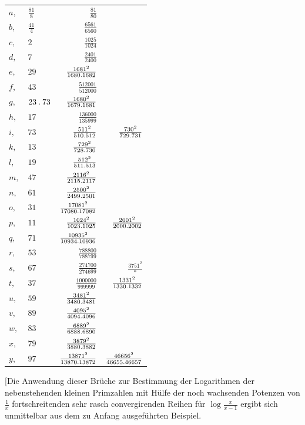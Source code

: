 \begin{longtable}{@{}llrr@{}}
$a,$ & $\frac{81}{8}$ & $\frac{81}{80}$ & \\
$b,$ & $\frac{41}{4}$ & $\frac{6561}{6560}$ & \\
$c,$ & $2$ & $\frac{1025}{1024}$ & \\
$d,$ & $7$ & $\frac{2401}{2400}$ & \\
$e,$ & $29$ & $\frac{1681^2}{1680\mathbin{.} 1682}$ & \\
$f,$ & $43$ & $\frac{512001}{512000}$ & \\
$g,$ & $23\mathbin{.} 73$ & $\frac{1680^2}{1679\mathbin{.} 1681}$ & \\
$h,$ & $17$ & $\frac{136000}{135999}$ & \\
$i,$ & $73$ & $\frac{511^2}{510\mathbin{.} 512}$ &  $\frac{730^2}{729\mathbin{.} 731}$\\
$k,$ & $13$ & $\frac{729^2}{728\mathbin{.} 730}$ & \\
$l,$ & $19$ & $\frac{512^2}{511\mathbin{.} 513}$ & \\
$m,$ & $47$ & $\frac{2116^2}{2115\mathbin{.} 2117}$ & \\
$n,$ & $61$ & $\frac{2500^2}{2499\mathbin{.} 2501}$ & \\
$o,$ & $31$ & $\frac{17081^2}{17080\mathbin{.} 17082}$ & \\
$p,$ & $11$ & $\frac{1024^2}{1023\mathbin{.} 1025}$ &  $\frac{2001^2}{2000\mathbin{.} 2002}$\\
$q,$ & $71$ & $\frac{10935^2}{10934\mathbin{.} 10936}$ & \\
$r,$ & $53$ & $\frac{788800}{788799}$ & \\
$s,$ & $67$ & $\frac{274700}{274699}$ &  $\frac{3751^2}{*}$\\
$t,$ & $37$ & $\frac{1000000}{999999}$ &  $\frac{1331^2}{1330\mathbin{.} 1332}$\\
$u,$ & $59$ & $\frac{3481^2}{3480\mathbin{.} 3481}$ & \\
$v,$ & $89$ & $\frac{4095^2}{4094\mathbin{.} 4096}$ & \\
$w,$ & $83$ & $\frac{6889^2}{6888\mathbin{.} 6890}$ & \\
$x,$ & $79$ & $\frac{3879^2}{3880\mathbin{.} 3882}$ & \\
$y,$ & $97$ & $\frac{13871^2}{13870\mathbin{.} 13872}$ &  $\frac{46656^2}{46655\mathbin{.} 46657}$\\
\end{longtable}\endgroup
[Die Anwendung dieser Brüche zur Bestimmung der Logarithmen der nebenstehenden kleinen Primzahlen mit Hülfe der noch wachsenden Potenzen von $\frac1x$ fortschreitenden sehr rasch convergirenden Reihen für $\log\frac{x}{x-1}$ ergibt sich unmittelbar aus dem zu Anfang ausgeführten Beispiel.\par
